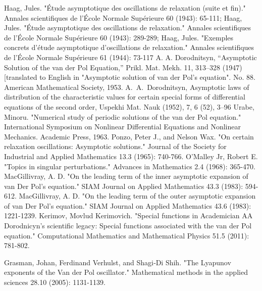 \documentclass[final]{article}
\begin{document}
\begin{thebibliography}{}
	
 Haag, Jules. "\'Etude asymptotique des oscillations de relaxation (suite et fin)." Annales scientifiques de l'\'Ecole Normale Sup\'erieure 60 (1943): 65-111; %
 Haag, Jules. "\'Etude asymptotique des oscillations de relaxation." Annales scientifiques de l'\'Ecole Normale Supérieure 60 (1943): 289-289; %
 Haag, Jules. "Exemples concrets d'\'etude asymptotique d'oscillations de relaxation." Annales scientifiques de l'\'Ecole Normale Supérieure 61 (1944): 73-117 %
 A. A. Dorodnitsyn, “Asymptotic Solution of the van der Pol Equation,” Prikl. Mat. Mekh. 11, 313–328 (1947)
[translated to English in "Asymptotic solution of van der Pol's equation". No. 88. American Mathematical Society, 1953.
 A.~A.~Dorodnitsyn, Asymptotic laws of distribution of the characteristic values for certain special forms of differential equations of the second order, Uspekhi Mat. Nauk (1952), 7, 6 (52), 3--96
 Urabe, Minoru. "Numerical study of periodic solutions of the van der Pol equation." International Symposium on Nonlinear Differential Equations and Nonlinear Mechanics. Academic Press, 1963.
 Ponzo, Peter J., and Nelson Wax. "On certain relaxation oscillations: Asymptotic solutions." Journal of the Society for Industrial and Applied Mathematics 13.3 (1965): 740-766.
 O'Malley Jr, Robert E. "Topics in singular perturbations." Advances in Mathematics 2.4 (1968): 365-470.
 MacGillivray, A. D. "On the leading term of the inner asymptotic expansion of van Der Pol’s equation." SIAM Journal on Applied Mathematics 43.3 (1983): 594-612.
 MacGillivray, A. D. "On the leading term of the outer asymptotic expansion of van Der Pol’s equation." SIAM Journal on Applied Mathematics 43.6 (1983): 1221-1239.
 Kerimov, Movlud Kerimovich. "Special functions in Academician AA Dorodnicyn’s scientific legacy: Special functions associated with the van der Pol equation." Computational Mathematics and Mathematical Physics 51.5 (2011): 781-802.

 Grasman, Johan, Ferdinand Verhulst, and Shagi‐Di Shih. "The Lyapunov exponents of the Van der Pol oscillator." Mathematical methods in the applied sciences 28.10 (2005): 1131-1139.



\end{thebibliography}
\end{document}
